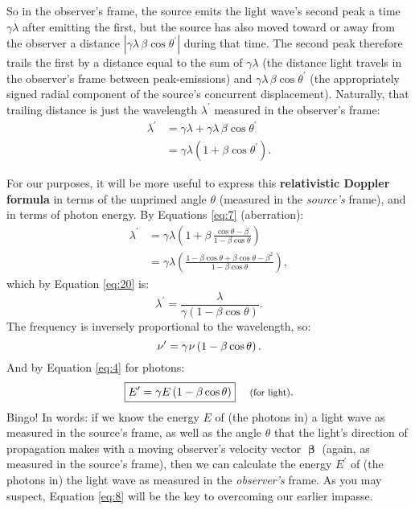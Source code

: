 \documentclass[12pt]{article}
\newcommand{\vvbeta}{\bm{\upbeta}}
\begin{document}
So in the observer's frame, the source emits the light wave's second peak a time $\gamma \lambda$ after emitting the first, but the source has also moved toward or away from the observer a distance $| \gamma \lambda \, \beta \cos \theta^\prime |$ during that time. The second peak therefore trails the first by a distance equal to the sum of $\gamma \lambda$ (the distance light travels in the observer's frame between peak-emissions) and $\gamma \lambda \, \beta \cos \theta^\prime$ (the appropriately signed radial component of the source's concurrent displacement). Naturally, that trailing distance is just the wavelength $\lambda^\prime$ measured in the observer's frame:
\begin{equation*}
\begin{aligned}
\lambda^\prime &= \gamma \lambda + \gamma \lambda \, \beta \cos \theta^\prime \\
&= \gamma \lambda \left( 1 + \beta \cos \theta^\prime \right).
\end{aligned}
\end{equation*}

For our purposes, it will be more useful to express this \textbf{relativistic Doppler formula} in terms of the unprimed angle $\theta$ (measured in the \emph{source's} frame), and in terms of photon energy. By Equations \ref{eq:7} (aberration):
\begin{equation*}
\begin{split}
\lambda^\prime &= \gamma \lambda \left( 1 + \beta \, \frac{\cos \theta - \beta}{1 - \beta \cos \theta} \right) \\[3pt]
&= \gamma \lambda \left( \frac{ 1 - \beta \cos \theta + \beta \cos \theta - \beta^2 }{1 - \beta \cos \theta} \right) ,
\end{split}
\end{equation*}
which by Equation \ref{eq:20} is:
\begin{equation}\label{eq:rdw}
\lambda^\prime = \frac{\lambda}{\gamma \left( 1 - \beta \cos \theta \right)}.
\end{equation}
The frequency is inversely proportional to the wavelength, so:
\begin{equation}\label{eq:rdf}
\nu^{\prime} = \gamma \mkern1mu \nu \left( 1- \beta \cos\theta \right).
\end{equation}
And by Equation \ref{eq:4} for photons:
\begin{equation}\label{eq:8}
\boxed{E^{\prime} = \gamma E \left(1-\beta \cos\theta\right)} \quad \text{\footnotesize{ (for light)}} .
\end{equation}
Bingo! In words: if we know the energy $E$ of (the photons in) a light wave as measured in the source's frame, as well as the angle $\theta$ that the light's direction of propagation makes with a moving observer's velocity vector $\vvbeta$ (again, as measured in the source's frame), then we can calculate the energy $E^\prime$ of (the photons in) the light wave as measured in the \emph{observer's} frame. As you may suspect, Equation \ref{eq:8} will be the key to overcoming our earlier impasse.
\end{document}
